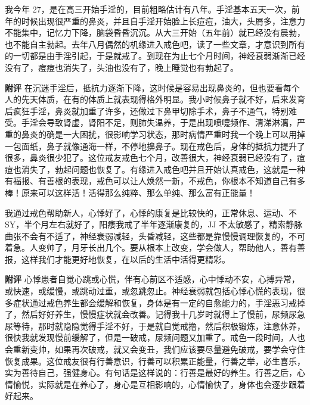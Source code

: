 \begin{case}[神经衰弱]
    我今年 27，是在高三开始手淫的，目前粗略估计有八年。手淫基本五天一次，前年的时候出现很严重的鼻炎，并且自手淫开始脸上长痘痘，油大，头屑多，注意力不能集中，记忆力下降，脑袋昏昏沉沉。从大三开始（五年前）就已经没有晨勃，也不能自主勃起。去年八月偶然的机缘进入戒色吧，读了一些文章，才意识到所有的一切都是由手淫引起，于是就戒了。到现在为止七个月时间，神经衰弱渐渐已经没有了，痘痘也消失了，头油也没有了，晚上睡觉也有勃起了。

    \textbf{附评} 在沉迷手淫后，抵抗力逐渐下降，这时候是容易出现鼻炎的，但也要看每个人的先天体质，在有的体质上就表现得格外明显。我小时候鼻子就不好，后来发育后疯狂手淫，鼻炎就加重了许多，还做过下鼻甲切除手术，鼻子不通气，特别难受。手淫会导致肾虚，肾阳不足，则肺失温养，于是出现喷嚏频作、清涕淋漓，严重的鼻炎的确是一大困扰，很影响学习状态，那时病情严重时我一个晚上可以用掉一包面纸，鼻子就像通海一样，不停地擤鼻子。现在戒色后，身体的抵抗力提升了很多，鼻炎很少犯了。这位戒友戒色七个月，改善很大，神经衰弱已经没有了，痘痘也消失了，勃起问题也恢复了。有缘进入戒色吧并且开始认真戒色，这就是一种有福报、有善根的表现，戒色可以让人焕然一新，不戒色，你根本不知道自己有多棒！原来可以这样活！活得那么纯粹、那么单纯、那么富有正能量！
\end{case}

\begin{case}[神经衰弱]
    我通过戒色帮助新人，心悸好了，心悸的康复是比较快的，正常休息、运动、不 SY，半个月左右就好了，阳痿我戒了半年逐渐康复的，JJ 不太敏感了，精索静脉曲张不会有不适了，神经衰弱减轻，头昏减轻，这些都是靠慢慢调理恢复的，不可着急。人变帅了，月牙长出几个。要从根本上改变，学会做人，帮助他人，善有善报，这样我们才能更好地恢复，在以后的生活中活得更精彩。

    \textbf{附评} 心悸患者自觉心跳或心慌，伴有心前区不适感，心中悸动不安，心搏异常，或快速，或缓慢，或跳动过重，或忽跳忽止。神经衰弱就包括心悸心慌的表现，很多症状通过戒色养生都会缓解和恢复，身体是有一定的自愈能力的，手淫恶习戒掉了，然后好好养生，慢慢症状就会改善。记得我十几岁时就得上了慢前，尿频尿急尿等待，那时就隐隐觉得手淫不好，于是就自觉戒撸，然后积极锻炼，注意休养，很快我就发现慢前缓解了，但是一破戒，尿频问题又加重了。戒色一段时间，人也会重新变帅，如果再次破戒，就又会变丑，我们应该要尽量避免破戒，要学会守住恢复成果。这位戒友很有行善意识，行善可以积累正能量，行善之举，必生喜乐，实为善待自己，强健身心。有句话是这样说的：行善是最好的养生。行善之后，心情愉悦，实际就是在养心了，身心是互相影响的，心情愉快了，身体也会逐步跟着好起来。
\end{case}


